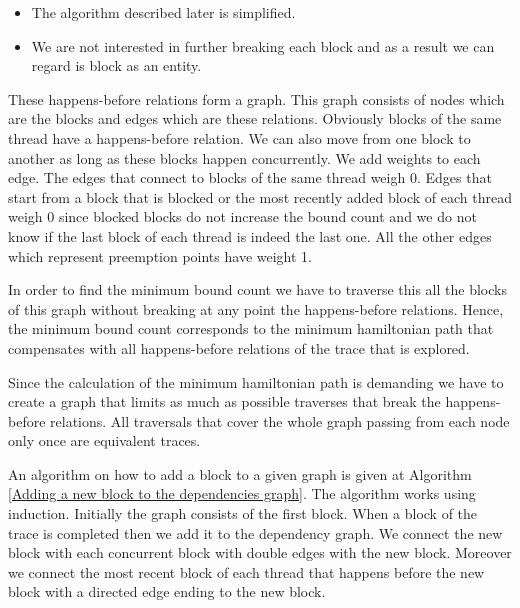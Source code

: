 \begin{itemize}
    \item The algorithm described later is simplified.
    \item We are not interested in further breaking each block and as a result we can regard is block as an entity.
\end{itemize}

These happens-before relations form a graph. This graph consists of nodes which are the blocks and edges which are these
relations. Obviously blocks of the same thread have a happens-before relation. We can also move from one block to
another as long as these blocks happen concurrently. We add weights to each edge. The edges that connect to blocks of
the same thread weigh 0. Edges that start from a block that is blocked or the most recently added block of each thread
weigh 0 since blocked blocks do not increase the bound count and we do not know if the last block of each thread is
indeed the last one. All the other edges which represent preemption points have weight 1.

In order to find the minimum bound count we have to traverse this all the blocks of this graph without breaking at any
point the happens-before relations. Hence, the minimum bound count corresponds to the minimum hamiltonian path that
compensates with all happens-before relations of the trace that is explored.

Since the calculation of the minimum hamiltonian path is demanding we have to create a graph that limits as much as
possible traverses that break the happens-before relations. All traversals that cover the whole graph passing from each
node only once are equivalent traces. 

\noindent An algorithm on how to add a block to a given graph is given at Algorithm \ref{Adding a new block to the
dependencies graph}. The algorithm works using induction. Initially the graph consists of the first block. When a block
of the trace is completed then we add it to the dependency graph. We connect the new block with each concurrent block
with double edges with the new block. Moreover we connect the most recent block of each thread that happens before the
new block with a directed edge ending to the new block. 

